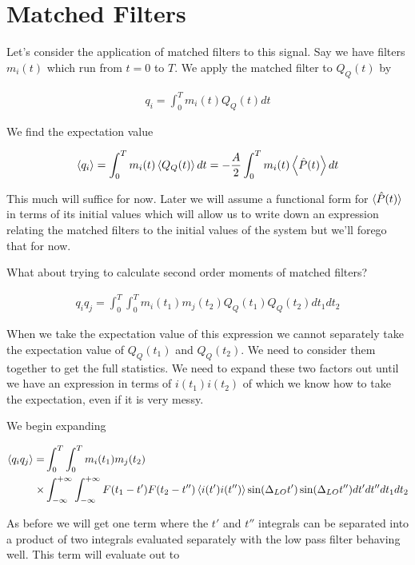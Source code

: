 \documentclass[12pt]{article}
\begin{document}
\section{Matched Filters}
Let's consider the application of matched filters to this signal. Say we have filters $m_i(t)$ which run from $t=0$ to $T$. We apply the matched filter to $Q_Q(t)$ by

\begin{align}
q_i = \int_0^T m_i(t) Q_Q(t) dt
\end{align}

We find the expectation value

\begin{align}
\braket{q_i} = \int_0^T m_i(t) \braket{Q_Q(t)} dt = -\frac{A}{2}\int_0^T m_i(t)\left<\hat{P}(t)\right> dt
\end{align}

This much will suffice for now. Later we will assume a functional form for $\braket{\hat{P}(t)}$ in terms of its initial values which will allow us to write down an expression relating the matched filters to the initial values of the system but we'll forego that for now.

What about trying to calculate second order moments of matched filters?

\begin{align}
q_i q_j = \int_0^T \int_0^T m_i(t_1)m_j(t_2) Q_Q(t_1)Q_Q(t_2) dt_1 dt_2
\end{align}

When we take the expectation value of this expression we cannot separately take the expectation value of $Q_Q(t_1)$ and $Q_Q(t_2)$. We need to consider them together to get the full statistics. We need to expand these two factors out until we have an expression in terms of $i(t_1)i(t_2)$ of which we know how to take the expectation, even if it is very messy.

We begin expanding

\begin{align}
\braket{q_iq_j} = &\int_0^T \int_0^T m_i(t_1)m_j(t_2)\\
\times& \int_{-\infty}^{+\infty}\int_{-\infty}^{+\infty}F(t_1-t')F(t_2-t'')\braket{i(t')i(t'')}\sin(\Delta_{LO}t')\sin(\Delta_{LO}t'')dt'dt''dt_1dt_2
\end{align}

As before we will get one term where the $t'$ and $t''$ integrals can be separated into a product of two integrals evaluated separately with the low pass filter behaving well. This term will evaluate out to
\end{document}
